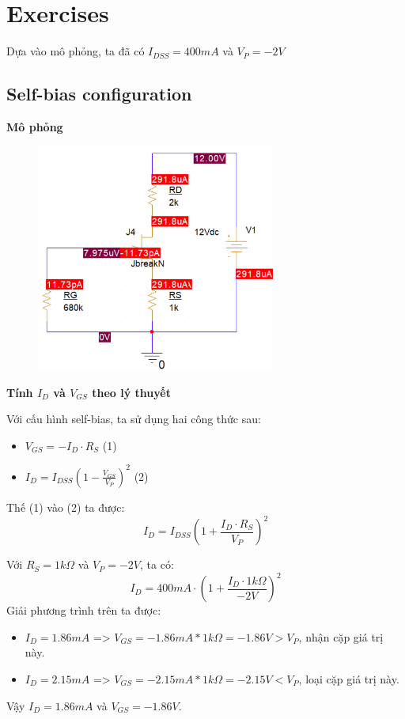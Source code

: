 \section{Exercises}
Dựa vào mô phỏng, ta đã có $I_{DSS} = 400mA$ và $V_P = -2V$
\subsection{Self-bias configuration}
\textbf{Mô phỏng}
\begin{figure}[!htbp]
    \centering
    \includegraphics[width=0.7\textwidth]{graphics/ex1/f1.PNG}
\end{figure}

\textbf{Tính $I_D$ và $V_{GS}$ theo lý thuyết}

Với cấu hình self-bias, ta sử dụng hai công thức sau:
\begin{itemize}
    \item $V_{GS} = -I_D \cdot R_S$ (1)
    \item $I_D = I_{DSS} \left(1 - \frac{V_{GS}}{V_P}\right)^2$ (2) 
\end{itemize}
Thế (1) vào (2) ta được:
\[
    I_D = I_{DSS} \left(1 + \frac{I_D \cdot R_S}{V_P}\right)^2
\] 

Với $R_S = 1k \Omega$ và $V_P = -2V$, ta có:
\[
    I_D = 400mA \cdot \left(1 + \frac{I_D \cdot 1k \Omega}{-2V}\right)^2
\]
Giải phương trình trên ta được:
\begin{itemize}
    \item $I_D = 1.86mA$ => $V_{GS} = -1.86mA * 1k \Omega = -1.86V > V_{P}$, nhận cặp giá trị này. 
    \item $I_D = 2.15mA$ => $V_{GS} = -2.15mA * 1k \Omega = -2.15V < V_{P}$, loại cặp giá trị này. 
\end{itemize}
Vậy $I_D = 1.86mA$ và $V_{GS} = -1.86V$.



